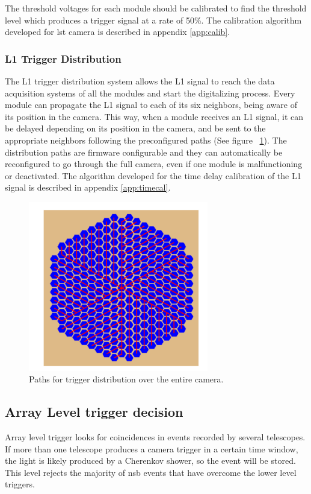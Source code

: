 \documentclass[main.tex]{subfiles}
\begin{document}
The threshold voltages for each module should be calibrated to find the threshold level which produces a trigger signal at a rate of 50\%. The calibration algorithm developed for \gls{lst} camera is described in appendix \ref{app:calib}.

\subsubsection{L1 Trigger Distribution}

The L1 trigger distribution system allows the L1 signal to reach the data acquisition systems of all the modules and start the digitalizing process. Every module can propagate the L1 signal to each of its six neighbors, being aware of its position in the camera. This way, when a module receives an L1 signal, it can be delayed depending on its position in the camera, and be sent to the appropriate neighbors following the preconfigured paths (See figure ~\ref{fig:trigpaths}). The distribution paths are firmware configurable and they can automatically be reconfigured to go through the full camera, even if one module is malfunctioning or deactivated. The algorithm developed for the time delay calibration of the L1 signal is described in appendix \ref{app:timecal}.

\begin{figure}[h]
  \centering
  \includegraphics[width=0.7\textwidth]{./Pictures/triggerpaths.pdf}
  \caption{Paths for trigger distribution over the entire camera.}
  \label{fig:trigpaths}
\end{figure}

\subsection{Array Level trigger decision}

Array level trigger looks for coincidences in events recorded by several telescopes. If more than one telescope produces a camera trigger in a certain time window, the light is likely produced by a Cherenkov shower, so the event will be stored. This level rejects the majority of \gls{nsb} events that have overcome the lower level triggers.
\end{document}
